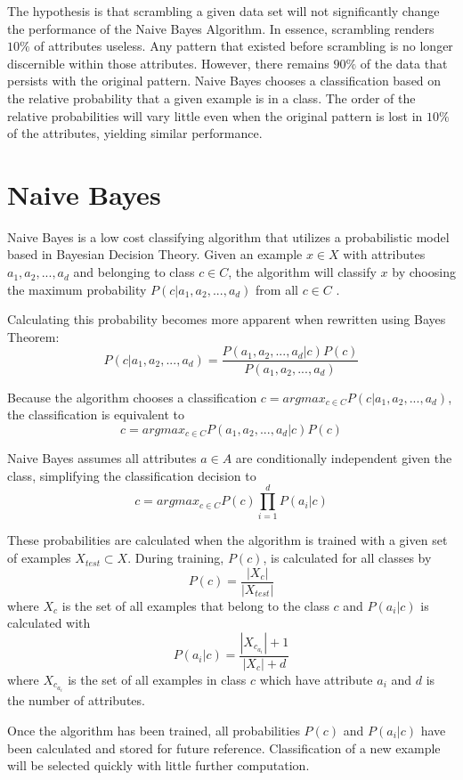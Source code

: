 \documentclass[twoside,11pt]{article}
\begin{document}
The hypothesis is that scrambling a given data set will not significantly change the performance of the Naive Bayes Algorithm. In essence, scrambling renders $10\%$ of attributes useless. Any pattern that existed before scrambling is no longer discernible within those attributes. However, there remains $90\%$ of the data that persists with the original pattern. Naive Bayes chooses a classification based on the relative probability that a given example is in a class. The order of the relative probabilities will vary little even when the original pattern is lost in $10\%$ of the attributes, yielding similar performance.

\section{Naive Bayes}

Naive Bayes is a low cost classifying algorithm that utilizes a probabilistic model based in Bayesian Decision Theory. Given an example $x \in X$ with attributes $a_1, a_2, ..., a_d$ and belonging to class $c \in C$, the algorithm will classify $x$ by choosing the maximum probability $P(c|a_1, a_2, ..., a_d)$ from all $c \in C$ \citep{nbPaper}.

Calculating this probability becomes more apparent when rewritten using Bayes Theorem:
$$P(c|a_1, a_2, ..., a_d) = \frac{P(a_1, a_2, ..., a_d | c)P(c)}{P(a_1, a_2, ..., a_d)} $$

Because the algorithm chooses a classification $c = argmax_{c \in C}P(c|a_1, a_2, ..., a_d)$, the classification is equivalent to
$$c = argmax_{c \in C}P(a_1, a_2, ..., a_d | c)P(c)$$

Naive Bayes assumes all attributes $a \in A$ are conditionally independent given the class, simplifying the classification decision to 
$$c = argmax_{c \in C}P(c)\prod_{i = 1}^{d}P(a_i | c)$$

These probabilities are calculated when the algorithm is trained with a given set of examples $X_{test} \subset X$. During training, $P(c)$, is calculated for all classes by
$$P(c) = \frac{|X_c|}{|X_{test}|}$$
where $X_c$ is the set of all examples that belong to the class $c$ and $P(a_i | c)$ is calculated with
$$P(a_i | c) = \frac{|X_{c_{a_i}}| + 1}{|X_c| + d}$$
where $X_{c_{a_i}}$ is the set of all examples in class $c$ which have attribute $a_i$ and $d$ is the number of attributes.

Once the algorithm has been trained, all probabilities $P(c)$ and $P(a_i | c)$ have been calculated and stored for future reference. Classification of a new example will be selected quickly with little further computation.
\end{document}
